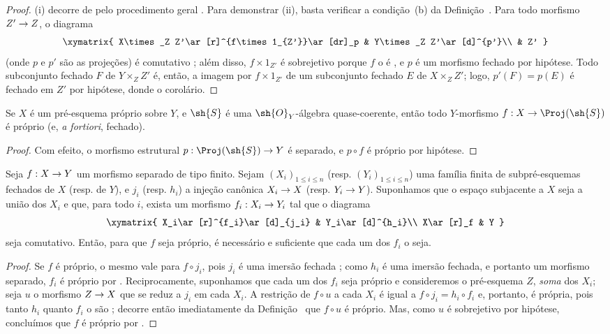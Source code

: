 \documentclass[oneside,10pt]{amsart}
\makeatletter
\renewcommand{\leq}{\leqslant}
\newcommand{\ega@arrow}[2]{\mathchoice{#1}{#2}{#2}{#2}}
\renewcommand{\to}{\ega@arrow{\longrightarrow}{\rightarrow}}
\newcommand{\oldpage}[2][]{\marginnote{\normalfont\footnotesize\textbf{#1}~|~#2}\ignorespaces}
\let\EGAOriginalLabel\label
\renewcommand{\label}[1]{\phantomsection\EGAOriginalLabel{#1}}
\makeatother
\begin{document}
\begin{proof}
(i) decorre de  pelo procedimento geral .
Para demonstrar (ii), basta verificar a condição~(b) da Definição~.
Para todo morfismo $Z'\to Z$, o diagrama
\[
  \xymatrix{
    X\times_Z Z'\ar[r]^{f\times1_{Z'}}\ar[dr]_p &
    Y\times_Z Z'\ar[d]^{p'}\\
    & Z'
  }
\]
(onde $p$ e $p'$ são as projeções) é comutativo ;
além disso, $f\times1_{Z'}$ é sobrejetivo porque $f$ o é , e $p$ é um morfismo fechado por hipótese.
Todo subconjunto fechado $F$ de $Y\times_Z Z'$ é, então, a imagem por $f\times1_{Z'}$ de um subconjunto fechado $E$ de $X\times_Z Z'$; logo, $p'(F)=p(E)$ é fechado em $Z'$ por hipótese, donde o corolário.
\end{proof}

\begin{corollary}[5.4.4]
\label{II.5.4.4}
Se $X$ é um pré-esquema próprio sobre $Y$, e $\sh{S}$ é uma $\sh{O}_Y$-álgebra quase-coerente, então todo $Y$-morfismo $f:X\to\Proj(\sh{S})$ é próprio (e, \emph{a fortiori}, fechado).
\end{corollary}

\begin{proof}
Com efeito, o morfismo estrutural $p:\Proj(\sh{S})\to Y$ é separado, e $p\circ f$ é próprio por hipótese.
\end{proof}

\begin{corollary}[5.4.5]
\label{II.5.4.5}
Seja $f:X\to Y$ um morfismo separado de tipo finito.
Sejam $(X_i)_{1\leq i\leq n}$ (resp. $(Y_i)_{1\leq i\leq n}$) uma família finita de subpré-esquemas fechados de $X$ (resp. de $Y$), e $j_i$ (resp. $h_i$) a injeção canônica $X_i\to X$ (resp. $Y_i\to Y$).
Suponhamos que o espaço subjacente a $X$ seja a união dos $X_i$ e que, para todo $i$, exista um morfismo $f_i:X_i\to Y_i$ tal que o diagrama
\[
  \xymatrix{
    X_i\ar[r]^{f_i}\ar[d]_{j_i} &
    Y_i\ar[d]^{h_i}\\
    X\ar[r]_f &
    Y
  }
\]
seja comutativo.
Então, para que $f$ seja próprio, é necessário e suficiente que cada um dos $f_i$ o seja.
\end{corollary}
\oldpage[II]{102}
\begin{proof}
Se $f$ é próprio, o mesmo vale para $f\circ j_i$, pois $j_i$ é uma imersão fechada ;
como $h_i$ é uma imersão fechada, e portanto um morfismo separado, $f_i$ é próprio por .
Reciprocamente, suponhamos que cada um dos $f_i$ seja próprio e consideremos o pré-esquema $Z$, \emph{soma} dos $X_i$; seja $u$ o morfismo $Z\to X$ que se reduz a $j_i$ em cada $X_i$.
A restrição de $f\circ u$ a cada $X_i$ é igual a $f\circ j_i=h_i\circ f_i$ e, portanto, é própria, pois tanto $h_i$ quanto $f_i$ o são ;
decorre então imediatamente da Definição~ que $f\circ u$ é próprio.
Mas, como $u$ é sobrejetivo por hipótese, concluímos que $f$ é próprio por .
\end{proof}
\end{document}
